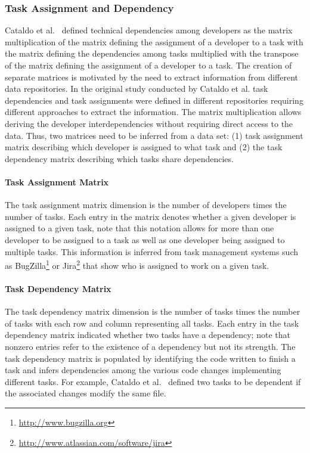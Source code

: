 \subsubsection{Task Assignment and Dependency}
Cataldo et al.~\cite{cataldo:cscw:2006} defined  technical dependencies among developers as the matrix multiplication of the matrix defining the assignment of a developer to a task with the matrix defining the dependencies among tasks multiplied with the transpose of the matrix defining the assignment of a developer to a task.
%
The creation of separate matrices is motivated by the need to extract information from different data repositories.
In the original study conducted by Cataldo et al. task dependencies and task assignments were defined in different repositories requiring different approaches to extract the information.
The matrix multiplication allows deriving the developer interdependencies without requiring direct access to the data.
%
Thus, two matrices need to be inferred from a data set: (1) task assignment matrix describing which developer is assigned to what task and (2) the task dependency matrix describing which tasks share dependencies.

\paragraph{Task Assignment Matrix}
The task assignment matrix dimension is the number of developers times the number of tasks.
Each entry in the matrix denotes whether a given developer is assigned to a given task, note that this notation allows for more than one developer to be assigned to a task as well as one developer being assigned to multiple tasks.
This information is inferred from task management systems such as BugZilla\footnote{\url{http://www.bugzilla.org}} or Jira\footnote{\url{http://www.atlassian.com/software/jira}} that show who is assigned to work on a given task.

\paragraph{Task Dependency Matrix}
The task dependency matrix dimension is the number of tasks times the number of tasks with each row and column representing all tasks.
Each entry in the task dependency matrix indicated whether two tasks have a dependency; note that nonzero entries refer to the existence of a dependency but not its strength.
The task dependency matrix is populated by identifying the code written to finish a task and infers dependencies among the various code changes implementing different tasks.
For example, Cataldo et al.~\cite{cataldo:cscw:2006} defined two tasks to be dependent if the associated changes modify the same file. 

